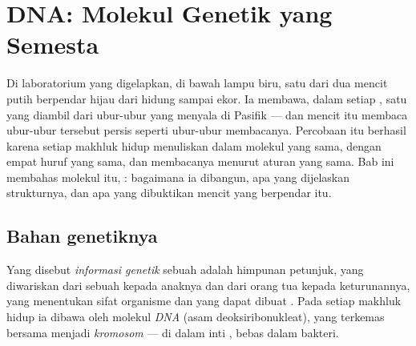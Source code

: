 \chapter{DNA: Molekul Genetik yang Semesta}\label{ch:g10:universal-dna}

Di laboratorium yang digelapkan, di bawah lampu biru, satu dari dua
mencit putih berpendar hijau dari hidung sampai ekor. Ia membawa, dalam
setiap , satu  yang diambil dari ubur-ubur yang menyala di
Pasifik --- dan  mencit itu membaca  ubur-ubur tersebut persis
seperti  ubur-ubur membacanya. Percobaan itu berhasil karena setiap
makhluk hidup menuliskan  dalam molekul yang sama, dengan empat
huruf yang sama, dan membacanya menurut aturan yang sama. Bab ini
membahas molekul itu, : bagaimana ia dibangun, apa yang dijelaskan
strukturnya, dan apa yang dibuktikan mencit yang berpendar itu.

\section{Bahan genetiknya}

\begin{definition}\label{def:g10:universal-dna:information}
Yang disebut \emph{informasi genetik} sebuah
 adalah himpunan petunjuk, yang diwariskan dari sebuah  kepada
 anaknya dan dari orang tua kepada keturunannya, yang menentukan
sifat organisme dan  yang dapat dibuat . Pada setiap
makhluk hidup ia dibawa oleh molekul \emph{DNA} (asam
deoksiribonukleat), yang terkemas bersama  menjadi
\emph{kromosom} --- di dalam inti , bebas
dalam  bakteri.
\end{definition}

